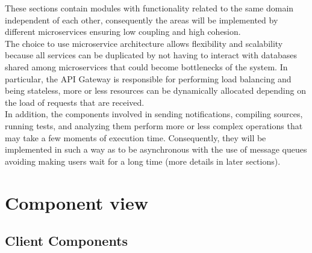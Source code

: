These sections contain modules with functionality related to the same domain independent of each other, consequently the areas will be implemented by different microservices ensuring low coupling and high cohesion.\\
The choice to use microservice architecture allows flexibility and scalability because all services can be duplicated by not having to interact with databases shared among microservices that could become bottlenecks of the system.
In particular, the API Gateway is responsible for performing load balancing and being stateless, more or less resources can be dynamically allocated depending on the load of requests that are received.\\
In addition, the components involved in sending notifications, compiling sources, running tests, and analyzing them perform more or less complex operations that may take a few moments of execution time.
Consequently, they will be implemented in such a way as to be asynchronous with the use of message queues avoiding making users wait for a long time (more details in later sections).


\section{Component view}
\begin{adjustbox}{
        max size={\textwidth}{},
        caption={Component view diagram},
        label={fig:Component view diagram},
        figure=H}
    \centering
\end{adjustbox}

\subsection{Client Components}

